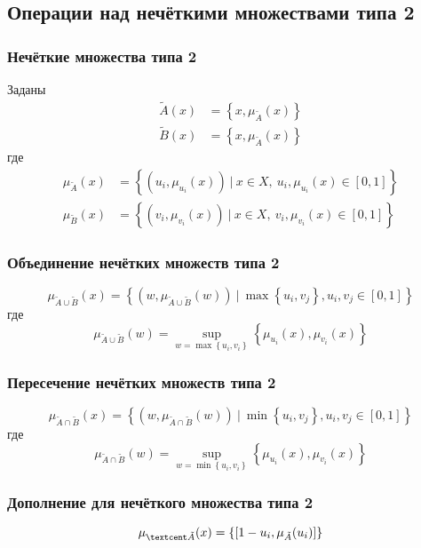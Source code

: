 \documentclass{beamer}
\begin{document}
\subsection{Операции над нечёткими множествами типа 2}

\begin{frame}\frametitle{Нечёткие множества типа 2}
    Заданы 
        \begin{equation*}
        \begin{align}
            \tilde{A}(x) &= \left\{x, \mu_{\tilde{A}}(x) \right\} \\
            \tilde{B}(x) &= \left\{x, \mu_{\tilde{A}}(x) \right\}
        \end{align}
    \end{equation*}
    где
    \begin{equation*}
        \begin{align}
            \mu_{\tilde{A}}(x) &= \left\{ (u_i, \mu_{u_i}(x))\ |\ x \in X,\ u_i, \mu_{u_i}(x) \in \left[0, 1\right] \right\} \\
            \mu_{\tilde{B}}(x) &= \left\{ (v_i, \mu_{v_i}(x))\ |\ x \in X,\ v_i, \mu_{v_i}(x) \in \left[0, 1\right] \right\}
        \end{align}
    \end{equation*}
\end{frame}

\begin{frame}\frametitle{Объединение нечётких множеств типа 2}
    \[
        \mu_{\tilde{A} \cup \tilde{B}}(x) = \left\{ (w, \mu_{\tilde{A} \cup \tilde{B}}(w))\ |\ \max\left\{ u_i, v_j \right\}, u_i, v_j \in \left[0, 1\right] \right\}
    \]
    где
    \[
        \mu_{\tilde{A} \cup \tilde{B}}(w) = \sup\limits_{w=\max{ \left\{u_i, v_i \right\} }}{ \left\{ \mu_{u_i}(x), \mu_{v_i}(x) \right\} }
    \]
\end{frame}

\begin{frame}\frametitle{Пересечение нечётких множеств типа 2}
    \[
        \mu_{\tilde{A} \cap \tilde{B}}(x) = \left\{ (w, \mu_{\tilde{A} \cap \tilde{B}}(w))\ |\ \min\left\{ u_i, v_j \right\}, u_i, v_j \in \left[0, 1\right] \right\}
    \]
    где
    \[
        \mu_{\tilde{A} \cap \tilde{B}}(w) = \sup\limits_{w=\min{ \left\{u_i, v_i \right\} }}{ \left\{ \mu_{u_i}(x), \mu_{v_i}(x) \right\} }
    \]
\end{frame}

\begin{frame}\frametitle{Дополнение для нечёткого множества типа 2}
    \[
         \mu_{\textcent \tilde A}(x) = \left\{ \left[ 1 - u_i, \mu_{\tilde A}(u_i) \right] \right\}
    \]
\end{frame}
\end{document}

